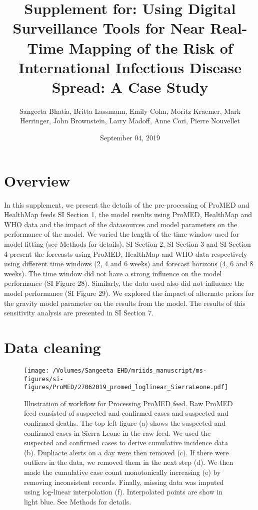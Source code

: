\documentclass[11pt,]{article}
\title{Supplement for: Using Digital Surveillance Tools for Near Real-Time
  Mapping of the Risk of International Infectious Disease Spread: A Case
  Study}
\author{Sangeeta Bhatia, Britta Lassmann, Emily Cohn, Moritz Kraemer, Mark
  Herringer, John Brownstein, Larry Madoff, Anne Cori, Pierre Nouvellet}
\date{September 04, 2019}
\begin{document}
\maketitle

{
  \setcounter{tocdepth}{2}
  \tableofcontents
}
\hypertarget{overview}{%
\section*{Overview}\label{overview}}

In this supplement, we present the details of the pre-processing of
ProMED and HealthMap feeds SI Section 1, the model results using ProMED,
HealthMap and WHO data and the impact of the datasources and model
parameters on the performance of the model. We varied the length of the
time window used for model fitting (see Methods for details). SI Section
2, SI Section 3 and SI Section 4 present the forecasts using ProMED,
HealthMap and WHO data respectively using different time windows (2, 4
and 6 weeks) and forecast horizons (4, 6 and 8 weeks). The time window
did not have a strong influence on the model performance (SI Figure 28).
Similarly, the data used also did not influence the model performance
(SI Figure 29). We explored the impact of alternate priors for the
gravity model parameter on the results from the model. The results of
this sensitivity analysis are presented in SI Section 7.

\hypertarget{data-cleaning}{%
  \section{Data cleaning}\label{data-cleaning}}

\begin{figure}
  \centering
  \texttt{[image: /Volumes/Sangeeta EHD/mriids\_manuscript/ms-figures/si-figures/ProMED/27062019\_promed\_loglinear\_SierraLeone.pdf]} 
  \caption{Illustration of workflow for Processing ProMED feed.
    Raw ProMED feed consisted of suspected and confirmed cases and suspected and confirmed
    deaths. The top left figure (a) shows the suspected and confirmed cases in Sierra Leone in the raw feed.
    We used the suspected and confirmed cases to derive cumulative
    incidence data (b). Dupliacte alerts on a day were then removed (c).
    If there were outliers in the data, we removed them in the next step (d).
    We then made the cumulative case count monotonically increasing (e) by
    removing inconsistent records. Finally, missing data was imputed using
    log-linear interpolation (f). Interpolated points are show in light blue.
    See Methods for details.}\label{fig:dataclean}
\end{figure}
\end{document}
